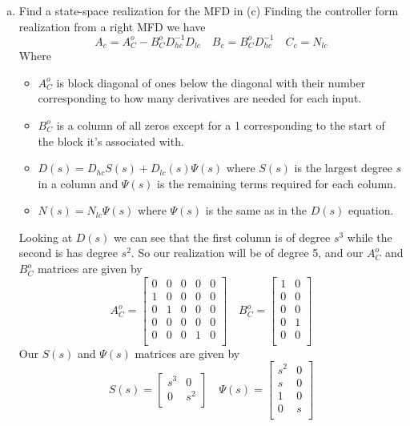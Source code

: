 \documentclass{article}
\begin{document}
\begin{enumerate}[(a)]
\item Find a state-space realization for the MFD in (c)
\newline
Finding the controller form realization from a right MFD we have
$$ A_c = A_C^o - B_C^oD_{hc}^{-1}D_{lc} \quad B_c = B_C^oD_{hc}^{-1} \quad C_c = N_{lc} $$
Where
\begin{itemize}[$\bullet$]
\item $A_C^o$ is block diagonal of ones below the diagonal with their number corresponding to how many derivatives are needed for each input.
\item $B_C^o$ is a column of all zeros except for a 1 corresponding to the start of the block it's associated with.
\item $D(s) = D_{hc}S(s) + D_{lc}(s)\Psi(s)$ where $S(s)$ is the largest degree $s$ in a column and $\Psi(s)$ is the remaining terms required for each column.
\item $N(s) = N_{lc}\Psi(s) $ where $\Psi(s)$ is the same as in the $D(s)$ equation.
\end{itemize}
Looking at $D(s)$ we can see that the first column is of degree $s^3$ while the second is has degree $s^2$.
So our realization will be of degree 5, and our $A_C^o$ and $B_C^o$ matrices are given by
$$
A_C^o =
\begin{bmatrix}
0 & 0 & 0 & 0 & 0 \\
1 & 0 & 0 & 0 & 0 \\
0 & 1 & 0 & 0 & 0 \\
0 & 0 & 0 & 0 & 0 \\
0 & 0 & 0 & 1 & 0 \\
\end{bmatrix}
\quad
B_C^o =
\begin{bmatrix}
1 & 0 \\
0 & 0 \\
0 & 0 \\
0 & 1 \\
0 & 0 \\
\end{bmatrix}
$$
Our $S(s)$ and $\Psi(s)$ matrices are given by
$$
S(s) =
\begin{bmatrix}
s^3 & 0 \\
0 & s^2 \\
\end{bmatrix}
\quad
\Psi(s) =
\begin{bmatrix}
s^2 & 0 \\
s & 0 \\
1 & 0 \\
0 & s \\

\end{bmatrix}$$
\end{enumerate}
\end{document}
